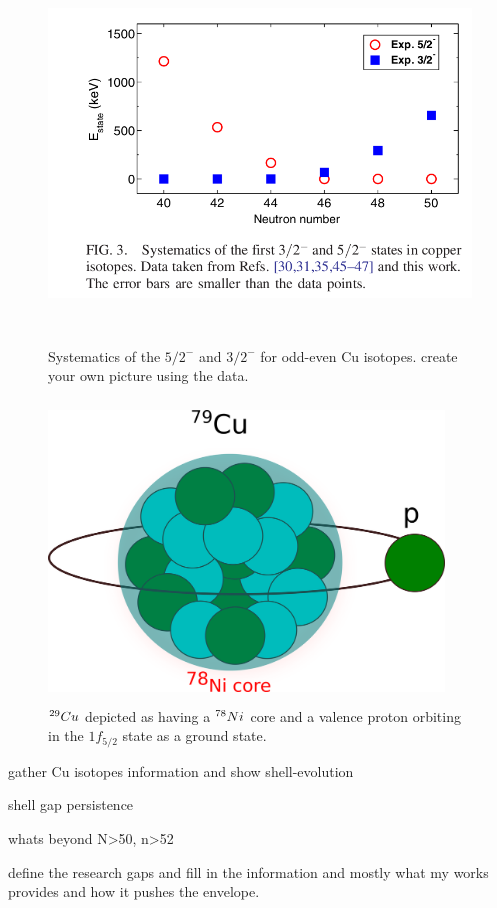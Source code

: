 \begin{figure}[h]
	\centering
	\includegraphics[width=14cm,height=10cm]{figures/Cu_5_2_sytematics.png}
	\caption[Systematics of the  $5/2^{-}$ and  $3/2^{-}$ for odd-even Cu isotopes. ]{Systematics of the  $5/2^{-}$ and  $3/2^{-}$ for odd-even Cu isotopes. create your own picture using the data. }
	\label{fig:5_2_sytematics}
\end{figure}


\begin{figure}[h]
	\centering
	\includegraphics[width=10.5cm,height=8cm]{figures/Cu79_cartoon.png}
	\caption[$\textsuperscript{29}Cu$ depicted as having a $\textsuperscript{78}Ni$ core]{$\textsuperscript{29}Cu$ depicted as having a $\textsuperscript{78}Ni$ core and a valence proton orbiting in the $1f_{5/2}$ state as a ground state. }
	\label{fig:Cu79_cartoon}
\end{figure}




gather Cu isotopes information and show shell-evolution 

shell gap persistence 

whats beyond N>50, n>52

define the research gaps and fill in the information and mostly what my works provides and how it pushes the envelope.



